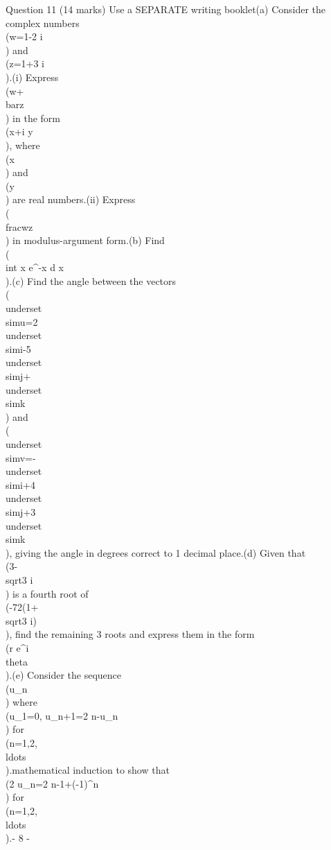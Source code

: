 Question 11 (14 marks) Use a SEPARATE writing booklet\n(a) Consider the complex numbers \\(w=1-2 i\\) and \\(z=1+3 i\\).\n(i) Express \\(w+\\bar{z}\\) in the form \\(x+i y\\), where \\(x\\) and \\(y\\) are real numbers.\n(ii) Express \\(\\frac{w}{z}\\) in modulus-argument form.\n{}\n(b) Find \\(\\int x e^{-x} d x\\).\n{}\n(c) Find the angle between the vectors \\(\\underset{\\sim}{u}=2 \\underset{\\sim}{i}-5 \\underset{\\sim}{j}+\\underset{\\sim}{k}\\) and \\(\\underset{\\sim}{v}=-\\underset{\\sim}{i}+4 \\underset{\\sim}{j}+3 \\underset{\\sim}{k}\\), giving\n{} the angle in degrees correct to 1 decimal place.\n(d) Given that \\(3-\\sqrt{3} i\\) is a fourth root of \\(-72(1+\\sqrt{3} i)\\), find the remaining 3 roots\n{} and express them in the form \\(r e^{i \\theta}\\).\n(e) Consider the sequence \\(u_{n}\\) where \\(u_{1}=0, u_{n+1}=2 n-u_{n}\\) for \\(n=1,2, \\ldots\\).\n{}\n\nUse mathematical induction to show that \\(2 u_{n}=2 n-1+(-1)^{n}\\) for \\(n=1,2, \\ldots\\).\n\n- 8 -